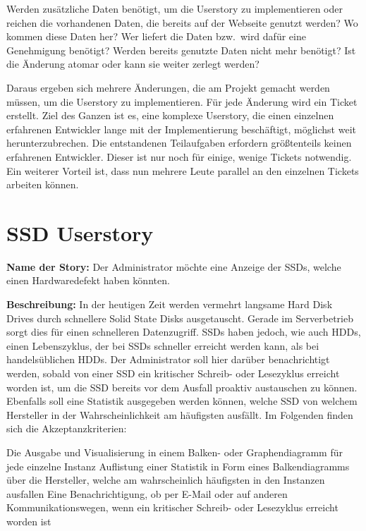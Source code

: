 {\begin{outline}
  \1 Werden zusätzliche Daten benötigt, um die Userstory zu implementieren oder
  reichen die vorhandenen Daten, die bereits auf der Webseite genutzt werden?
  \1 Wo kommen diese Daten her?
  \1 Wer liefert die Daten bzw.\ wird dafür eine Genehmigung benötigt?
  \1 Werden bereits genutzte Daten nicht mehr benötigt?
  \1 Ist die Änderung atomar oder kann sie weiter zerlegt werden?
\end{outline}

Daraus ergeben sich mehrere Änderungen, die am Projekt gemacht werden müssen,
um die Userstory zu implementieren. Für jede Änderung wird ein Ticket erstellt.
Ziel des Ganzen ist es, eine komplexe Userstory, die einen einzelnen erfahrenen
Entwickler lange mit der Implementierung beschäftigt, möglichst weit
herunterzubrechen. Die entstandenen Teilaufgaben erfordern größtenteils keinen
erfahrenen Entwickler. Dieser ist nur noch für einige, wenige Tickets
notwendig.  Ein weiterer Vorteil ist, dass nun mehrere Leute parallel an den
einzelnen Tickets arbeiten können.
\tm%

\section{SSD Userstory}
\textbf{Name der Story:} Der Administrator möchte eine Anzeige der SSDs, welche
einen Hardwaredefekt haben könnten.

\textbf{Beschreibung:} In der heutigen Zeit werden vermehrt langsame Hard Disk
Drives durch schnellere Solid State Disks ausgetauscht. Gerade im Serverbetrieb
sorgt dies für einen schnelleren Datenzugriff. SSDs haben jedoch, wie auch
HDDs, einen Lebenszyklus, der bei SSDs schneller erreicht werden kann, als bei
handelsüblichen HDDs. Der Administrator soll hier darüber benachrichtigt
werden, sobald von einer SSD ein kritischer Schreib- oder Lesezyklus erreicht
worden ist, um die SSD bereits vor dem Ausfall proaktiv austauschen zu können.
Ebenfalls soll eine Statistik ausgegeben werden können, welche SSD von welchem
Hersteller in der Wahrscheinlichkeit am häufigsten ausfällt. Im Folgenden
finden sich die Akzeptanzkriterien:

\begin{outline}
  \1 Die Ausgabe und Visualisierung in einem Balken- oder Graphendiagramm
  für jede einzelne Instanz
  \1 Auflistung einer Statistik in Form eines Balkendiagramms über die
  Hersteller, welche am wahrscheinlich häufigsten in den Instanzen ausfallen
  \1 Eine Benachrichtigung, ob per E\hyp{}Mail oder auf anderen
  Kommunikationswegen, wenn ein kritischer Schreib- oder Lesezyklus erreicht
  worden ist
\end{outline}

}
